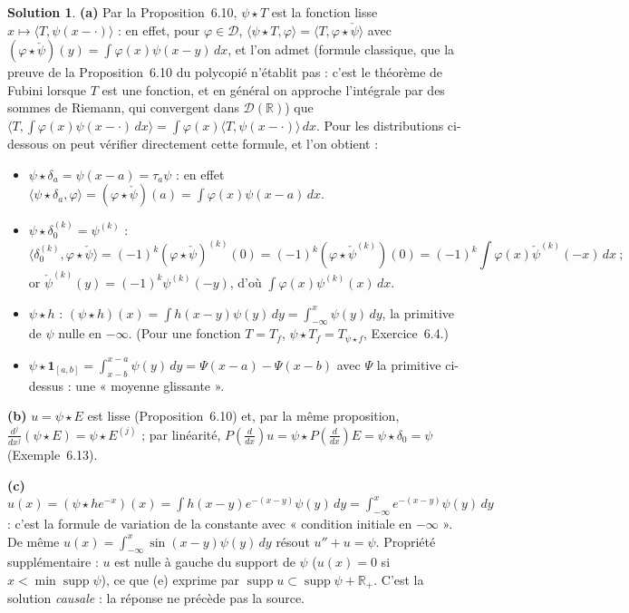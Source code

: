 \documentclass[11pt,a4paper]{article}
\newcommand{\R}{\mathbb{R}}
\DeclareMathOperator{\supp}{supp}
\newcommand{\D}{\mathcal{D}}
\theoremstyle{definition}
\newtheorem*{solution}{Solution}
\begin{document}
\begin{solution}
\noindent\textbf{(a)} Par la Proposition~6.10, $\psi\star T$ est la fonction lisse $x\mapsto\langle T,\psi(x-\cdot)\rangle$ : en effet, pour $\varphi\in\D$, $\langle\psi\star T,\varphi\rangle=\langle T,\varphi\star\check\psi\rangle$ avec $(\varphi\star\check\psi)(y)=\int\varphi(x)\psi(x-y)\,dx$, et l'on admet (formule classique, que la preuve de la Proposition~6.10 du polycopié n'établit pas : c'est le théorème de Fubini lorsque $T$ est une fonction, et en général on approche l'intégrale par des sommes de Riemann, qui convergent dans $\D(\R)$) que $\langle T,\int\varphi(x)\psi(x-\cdot)\,dx\rangle=\int\varphi(x)\langle T,\psi(x-\cdot)\rangle\,dx$. Pour les distributions ci-dessous on peut vérifier directement cette formule, et l'on obtient :
\begin{itemize}
  \item $\psi\star\delta_a=\psi(x-a)=\tau_a\psi$ : en effet $\langle\psi\star\delta_a,\varphi\rangle=(\varphi\star\check\psi)(a)=\int\varphi(x)\psi(x-a)\,dx$.
  \item $\psi\star\delta_0^{(k)}=\psi^{(k)}$ :
  \[
  \langle\delta_0^{(k)},\varphi\star\check\psi\rangle=(-1)^k(\varphi\star\check\psi)^{(k)}(0)=(-1)^k(\varphi\star\check\psi^{(k)})(0)=(-1)^k\int\varphi(x)\check\psi^{(k)}(-x)\,dx\ ;
  \]
  or $\check\psi^{(k)}(y)=(-1)^k\psi^{(k)}(-y)$, d'où $\int\varphi(x)\psi^{(k)}(x)\,dx$.
  \item $\psi\star h$ : $(\psi\star h)(x)=\int h(x-y)\psi(y)\,dy=\int_{-\infty}^x\psi(y)\,dy$, la primitive de $\psi$ nulle en $-\infty$. (Pour une fonction $T=T_f$, $\psi\star T_f=T_{\psi\star f}$, Exercice~6.4.)
  \item $\psi\star\mathbf 1_{[a,b]}=\int_{x-b}^{x-a}\psi(y)\,dy=\Psi(x-a)-\Psi(x-b)$ avec $\Psi$ la primitive ci-dessus : une « moyenne glissante ».
\end{itemize}

\medskip
\noindent\textbf{(b)} $u=\psi\star E$ est lisse (Proposition~6.10) et, par la même proposition, $\frac{d^j}{dx^j}(\psi\star E)=\psi\star E^{(j)}$ ; par linéarité, $P(\frac d{dx})u=\psi\star P(\frac d{dx})E=\psi\star\delta_0=\psi$ (Exemple~6.13).

\medskip
\noindent\textbf{(c)} $u(x)=(\psi\star he^{-x})(x)=\int h(x-y)e^{-(x-y)}\psi(y)\,dy=\int_{-\infty}^xe^{-(x-y)}\psi(y)\,dy$ : c'est la formule de variation de la constante avec « condition initiale en $-\infty$ ». De même $u(x)=\int_{-\infty}^x\sin(x-y)\psi(y)\,dy$ résout $u''+u=\psi$. Propriété supplémentaire : $u$ est nulle à gauche du support de $\psi$ ($u(x)=0$ si $x<\min\supp\psi$), ce que (e) exprime par $\supp u\subset\supp\psi+\R_+$. C'est la solution \emph{causale} : la réponse ne précède pas la source.


\end{solution}
\end{document}
